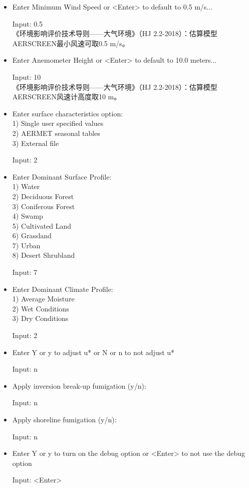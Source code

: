 \begin{framed}
\begin{itemize}[label=\textcolor{orange}{Prompt:}, align=left, leftmargin=*, itemsep=-0.5em]
    \item Enter Minimum Wind Speed or <Enter> to default to 0.5 m/s...
    \item[Input:] 0.5 \\
    《环境影响评价技术导则——大气环境》（HJ 2.2-2018）：估算模型AERSCREEN最小风速可取0.5 m/s。
    \item Enter Anemometer Height or <Enter> to default to 10.0 meters...
    \item[Input:] 10 \\
    《环境影响评价技术导则——大气环境》（HJ 2.2-2018）：估算模型AERSCREEN风速计高度取10 m。
    \item Enter surface characteristics option: \\
    1) Single user specified values \\
    2) AERMET seasonal tables \\
    3) External file
    \item[Input:] 2
    \item Enter Dominant Surface Profile: \\
    1) Water \\
    2) Deciduous Forest \\
    3) Coniferous Forest \\
    4) Swamp \\
    5) Cultivated Land \\
    6) Grassland \\
    7) Urban \\
    8) Desert Shrubland
    \item[Input:] 7
    \item Enter Dominant Climate Profile: \\
    1) Average Moisture \\
    2) Wet Conditions \\
    3) Dry Conditions
    \item[Input:] 2
    \item Enter Y or y to adjust u* or N or n to not adjust u*
    \item[Input:] n
    \item Apply inversion break-up fumigation (y/n):
    \item[Input:] n
    \item Apply shoreline fumigation (y/n):
    \item[Input:] n
    \item Enter Y or y to turn on the debug option or <Enter> to not use the debug option
    \item[Input:] <Enter>

\end{itemize}
\end{framed}
